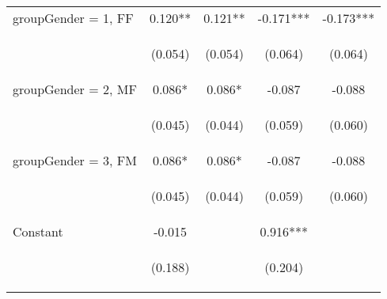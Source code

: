 \begin{center}
\begin{tabular}{lcccc}
groupGender = 1, FF & 0.120** & 0.121** & -0.171*** & -0.173*** \\
\vspace{4pt} & \begin{footnotesize}(0.054)\end{footnotesize} & \begin{footnotesize}(0.054)\end{footnotesize} & \begin{footnotesize}(0.064)\end{footnotesize} & \begin{footnotesize}(0.064)\end{footnotesize} \\
groupGender = 2, MF & 0.086* & 0.086* & -0.087 & -0.088 \\
\vspace{4pt} & \begin{footnotesize}(0.045)\end{footnotesize} & \begin{footnotesize}(0.044)\end{footnotesize} & \begin{footnotesize}(0.059)\end{footnotesize} & \begin{footnotesize}(0.060)\end{footnotesize} \\
groupGender = 3, FM & 0.086* & 0.086* & -0.087 & -0.088 \\
\vspace{4pt} & \begin{footnotesize}(0.045)\end{footnotesize} & \begin{footnotesize}(0.044)\end{footnotesize} & \begin{footnotesize}(0.059)\end{footnotesize} & \begin{footnotesize}(0.060)\end{footnotesize} \\
Constant & -0.015 &  & 0.916*** &  \\
 & \begin{footnotesize}(0.188)\end{footnotesize} & \begin{footnotesize}\end{footnotesize} & \begin{footnotesize}(0.204)\end{footnotesize} & \begin{footnotesize}\end{footnotesize} \\

\end{tabular}
\end{center}
